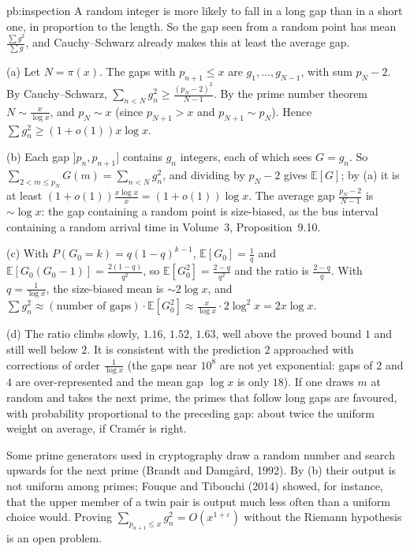 \begin{solution}{pb:inspection}
\idea A random integer is more likely to fall in a long gap than in a short one, in proportion to the length. So the gap seen from a random point has mean $\frac{\sum g^2}{\sum g}$,
and Cauchy--Schwarz already makes this at least the average gap.

\writeup (a) Let $N=\pi(x)$. The gaps with $p_{n+1}\le x$ are $g_1,\dots,g_{N-1}$, with sum $p_N-2$. By Cauchy--Schwarz,
$\sum_{n<N}g_n^2\ge\frac{(p_N-2)^2}{N-1}$. By the prime number theorem $N\sim\frac x{\log x}$, and $p_N\sim x$ (since $p_{N+1}>x$ and $p_{N+1}\sim p_N$). Hence $\sum g_n^2\ge(1+o(1))x\log x$.

(b) Each gap $]p_n,p_{n+1}]$ contains $g_n$ integers, each of which sees $G=g_n$. So $\sum_{2<m\le p_N}G(m)=\sum_{n<N}g_n^2$, and dividing by $p_N-2$ gives $\mathbb E[G]$; by (a) it is at least
$(1+o(1))\frac{x\log x}x=(1+o(1))\log x$. The average gap $\frac{p_N-2}{N-1}$ is $\sim\log x$: the gap containing a random point is size-biased, as the bus interval containing a random
arrival time in Volume~3, Proposition~9.10.

(c) With $P(G_0=k)=q(1-q)^{k-1}$, $\mathbb E[G_0]=\frac1q$ and $\mathbb E[G_0(G_0-1)]=\frac{2(1-q)}{q^2}$, so $\mathbb E[G_0^2]=\frac{2-q}{q^2}$ and the ratio is $\frac{2-q}q$. With $q=\frac1{\log x}$,
the size-biased mean is $\sim2\log x$, and $\sum g_n^2\approx(\text{number of gaps})\cdot\mathbb E[G_0^2]\approx\frac x{\log x}\cdot2\log^2x=2x\log x$.

(d) The ratio climbs slowly, $1.16$, $1.52$, $1.63$, well above the proved bound $1$ and still well below $2$. It is consistent with the prediction $2$ approached with corrections of order
$\frac1{\log x}$ (the gaps near $10^8$ are not yet exponential: gaps of $2$ and $4$ are over-represented and the mean gap $\log x$ is only $18$). If one draws $m$ at random and takes the next prime,
the primes that follow long gaps are favoured, with probability proportional to the preceding gap: about twice the uniform weight on average, if Cram\'er is right.

\leads Some prime generators used in cryptography draw a random number and search upwards for the next prime (Brandt and Damg\aa rd, 1992). By (b) their output is not uniform among
primes; Fouque and Tibouchi (2014) showed, for instance, that the upper member of a twin pair is output much less often than a uniform choice would. Proving
$\sum_{p_{n+1}\le x}g_n^2=O(x^{1+\varepsilon})$ without the Riemann hypothesis is an open problem.
\end{solution}

